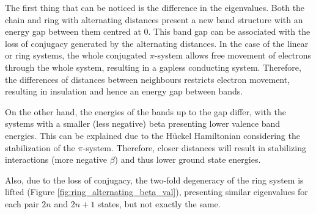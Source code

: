 \documentclass[twocolumn]{article}
\begin{document}
The first thing that can be noticed is the difference in the eigenvalues. Both the chain and ring with alternating distances present a new band structure with an energy gap between them centred at $0$. This band gap can be associated with the loss of conjugacy generated by the alternating distances. In the case of the linear or ring systems, the whole conjugated $\pi$-system allows free movement of electrons through the whole system, resulting in a gapless conducting system. Therefore, the differences of distances between neighbours restricts electron movement, resulting in insulation and hence an energy gap between bands. 

On the other hand, the energies of the bands up to the gap differ, with the systems with a smaller (less negative) beta presenting lower valence band energies. This can be explained due to the Hückel Hamiltonian considering the stabilization of the $\pi$-system. Therefore, closer distances will result in stabilizing interactions (more negative $\beta$) and thus lower ground state energies. 

Also, due to the loss of conjugacy, the two-fold degeneracy of the ring system is lifted (Figure \ref{fig:ring_alternating_beta_val}), presenting similar eigenvalues for each pair $2n$ and $2n+1$ states, but not exactly the same.
\end{document}
